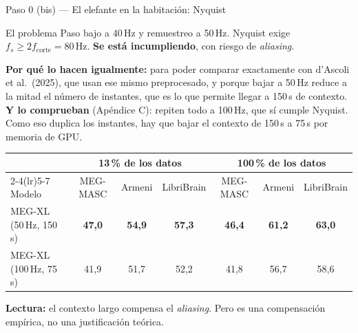 \documentclass[aspectratio=169,10pt]{beamer}
\newcommand{\term}[1]{\textbf{\color{deepgreen}#1}}
\newcommand{\eng}[1]{{\itshape\color{muted}#1}}
\begin{document}
\begin{frame}[c]{Paso 0 (bis) --- El elefante en la habitación: Nyquist}
  \small
  \begin{alertblock}{El problema}
    Paso bajo a 40\,Hz y remuestreo a 50\,Hz. Nyquist exige $f_s \geq 2 f_{\text{corte}} = 80$\,Hz. \term{Se está incumpliendo}, con riesgo de \eng{aliasing}.
  \end{alertblock}
  \vspace{1mm}
  \textbf{Por qué lo hacen igualmente:} para poder comparar exactamente con d'Ascoli et al.\ (2025), que usan ese mismo preprocesado, y porque bajar a 50\,Hz reduce a la mitad el número de instantes, que es lo que permite llegar a 150\,s de contexto.
  \vspace{2mm}
  \textbf{Y lo comprueban} (Apéndice C): repiten todo a 100\,Hz, que sí cumple Nyquist. Como eso duplica los instantes, hay que bajar el contexto de 150\,s a 75\,s por memoria de GPU.
  \vspace{1mm}
  \begin{center}
  \footnotesize
  \begin{tabular}{lcccccc}
    \toprule
    & \multicolumn{3}{c}{13\,\% de los datos} & \multicolumn{3}{c}{100\,\% de los datos} \\
    \cmidrule(lr){2-4}\cmidrule(lr){5-7}
    Modelo & MEG-MASC & Armeni & LibriBrain & MEG-MASC & Armeni & LibriBrain \\
    \midrule
    MEG-XL (50\,Hz, 150\,s)  & \textbf{47,0} & \textbf{54,9} & \textbf{57,3} & \textbf{46,4} & \textbf{61,2} & \textbf{63,0} \\
    MEG-XL (100\,Hz, 75\,s)  & 41,9 & 51,7 & 52,2 & 41,8 & 56,7 & 58,6 \\
    \bottomrule
  \end{tabular}
  \end{center}
  \vspace{1mm}
  \centering\small
  \term{Lectura:} el contexto largo compensa el \eng{aliasing}. Pero es una compensación empírica, no una justificación teórica.
\end{frame}
\end{document}
